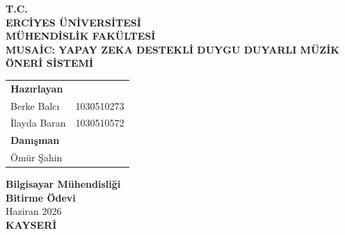 \documentclass[12pt, a4paper]{report}
\begin{document}

\begin{titlepage}
  \thispagestyle{empty}
  \begin{center}
    {\large\bfseries T.C.}\\[0.3cm]
    {\large\bfseries ERCİYES ÜNİVERSİTESİ}\\[0.2cm]
    {\large\bfseries MÜHENDİSLİK FAKÜLTESİ}\\[3cm]

    {\LARGE\bfseries MUSAİC: YAPAY ZEKA DESTEKLİ DUYGU DUYARLI MÜZİK ÖNERİ SİSTEMİ}\\[3cm]

    {\normalsize
    \begin{tabular}{ll}
      \textbf{Hazırlayan} & \\[0.2cm]
      Berke Balcı         & 1030510273 \\[0.1cm]
      İlayda Baran        & 1030510572 \\[0.8cm]
      \textbf{Danışman}  & \\[0.2cm]
      Ömür Şahin          & \\
    \end{tabular}
    }

    \vfill
    {\normalsize\bfseries Bilgisayar Mühendisliği}\\[0.2cm]
    {\normalsize\bfseries Bitirme Ödevi}\\[0.5cm]
    {\normalsize Haziran 2026}\\[0.3cm]
    {\normalsize\bfseries KAYSERİ}
  \end{center}
\end{titlepage}

\setcounter{page}{1}
\end{document}
